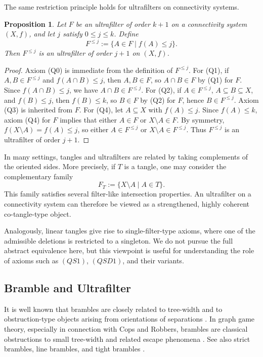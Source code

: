 \documentclass[10pt]{book}
\newtheorem{proposition}[theorem]{Proposition}
\theoremstyle{definition}
\begin{document}
The same restriction principle holds for ultrafilters on connectivity systems.

\begin{proposition}
Let \(F\) be an ultrafilter of order \(k+1\) on a connectivity system \((X,f)\), and let \(j\) satisfy \(0\leq j\leq k\).  
Define
\[
F^{\leq j}:=\{A\in F \mid f(A)\leq j\}.
\]
Then \(F^{\leq j}\) is an ultrafilter of order \(j+1\) on \((X,f)\).
\end{proposition}

\begin{proof}
Axiom (Q0) is immediate from the definition of \(F^{\leq j}\).  
For (Q1), if \(A,B\in F^{\leq j}\) and \(f(A\cap B)\leq j\), then \(A,B\in F\), so \(A\cap B\in F\) by (Q1) for \(F\). Since \(f(A\cap B)\leq j\), we have \(A\cap B\in F^{\leq j}\).  
For (Q2), if \(A\in F^{\leq j}\), \(A\subseteq B\subseteq X\), and \(f(B)\leq j\), then \(f(B)\leq k\), so \(B\in F\) by (Q2) for \(F\), hence \(B\in F^{\leq j}\).  
Axiom (Q3) is inherited from \(F\).  
For (Q4), let \(A\subseteq X\) with \(f(A)\leq j\). Since \(f(A)\leq k\), axiom (Q4) for \(F\) implies that either \(A\in F\) or \(X\setminus A\in F\). By symmetry, \(f(X\setminus A)=f(A)\leq j\), so either \(A\in F^{\leq j}\) or \(X\setminus A\in F^{\leq j}\).  
Thus \(F^{\leq j}\) is an ultrafilter of order \(j+1\).
\end{proof}

In many settings, tangles and ultrafilters are related by taking complements of the oriented sides.  
More precisely, if \(T\) is a tangle, one may consider the complementary family
\[
F_T:=\{X\setminus A \mid A\in T\}.
\]
This family satisfies several filter-like intersection properties.  
An ultrafilter on a connectivity system can therefore be viewed as a strengthened, highly coherent co-tangle-type object.

Analogously, linear tangles give rise to single-filter-type axioms, where one of the admissible deletions is restricted to a singleton.  
We do not pursue the full abstract equivalence here, but this viewpoint is useful for understanding the role of axioms such as \((QS1)\), \((QSD1)\), and their variants.

\subsection{Bramble and Ultrafilter}

It is well known that brambles are closely related to tree-width and to obstruction-type objects arising from orientations of separations \cite{2}.  
In graph game theory, especially in connection with Cops and Robbers, brambles are classical obstructions to small tree-width and related escape phenomena \cite{143,an2024sparse}.  
See also strict brambles, line brambles, and tight brambles \cite{Lardas2022OnSB,harvey2015treewidth,harvey2012treewidth,mescoff2023mixed}.
\end{document}
